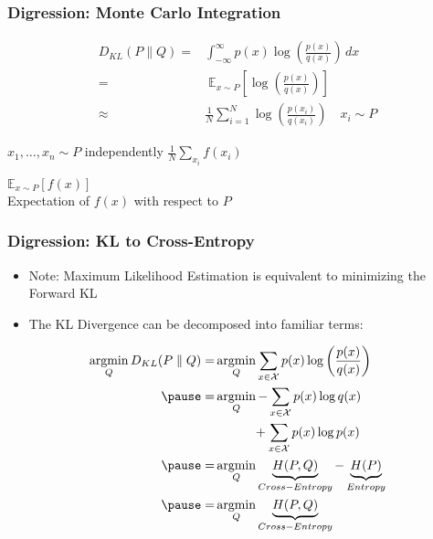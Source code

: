 \documentclass{beamer}
\DeclareMathOperator*{\argmin}{argmin}
\begin{document}
\begin{frame}
  \frametitle{Digression: Monte Carlo Integration}
    \begin{equation*}
      \begin{aligned}
      D_{KL} (P \parallel Q) =& \int_{-\infty}^{\infty} p(x)\log \left({\frac {p(x)}{q(x)}}\right)\,dx \\
      =& \; \mathbb{E}_{x \sim P} \left[ \log \left( \frac{p(x)}{q(x)} \right) \right] \\
      \approx& \frac{1}{N}\sum_{i=1}^{N} \log \left( \frac{p(x_i)}{q(x_i)} \right) \quad x_i \sim P
      \end{aligned}
    \end{equation*}
    \begin{algorithm}[H]
    \begin{algorithmic}[1]
      \STATE $x_1, \hdots, x_n \sim P$ independently
      \RETURN $\frac{1}{N}\sum_{x_i} f(x_i)$
    \end{algorithmic}
    \caption{$\mathbb{E}_{x \sim P}[f(x)]$\\Expectation of $f(x)$ with respect to $P$}
    \end{algorithm}
\end{frame}


\begin{frame}
  \frametitle{Digression: KL to Cross-Entropy}
  \begin{itemize}
    \item Note: Maximum Likelihood Estimation is equivalent to minimizing the Forward KL
    \pause
    \item The KL Divergence can be decomposed into familiar terms:
  \end{itemize}
  \begin{equation*}
    \begin{aligned}
      \argmin_{Q} D_{KL} (P \parallel Q) =& \argmin_{Q} \sum_{x \in \mathcal {X}} p(x)\log \left({\frac {p(x)}{q(x)}}\right) \\
      \pause
      =& \argmin_{Q} - \sum_{x \in \mathcal {X}} p(x)\log q(x) \\
      & \quad\quad\quad + \sum_{x \in \mathcal {X}} p(x)\log p(x) \\
      \pause
      =& \argmin_{Q} \underbrace{H(P, Q)}_{Cross-Entropy} - \underbrace{H(P)}_{Entropy} \\
      \pause
      =& \argmin_{Q} \underbrace{H(P, Q)}_{Cross-Entropy}
    \end{aligned}
  \end{equation*}
\end{frame}
\end{document}
